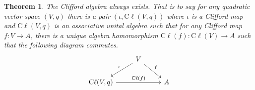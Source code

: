 \documentclass[a4paper]{report}
\newcommand{\cliff}{\mathrm{C}\ell}
\theoremstyle{definition}
\theoremstyle{plain}
\newtheorem{theorem}{Theorem}[section]
\theoremstyle{remark}
\begin{document}
\begin{theorem}
  The Clifford algebra always exists. That is to say for any quadratic vector space $(V, q)$ there is a pair $(\iota, \cliff(V,q))$ where $\iota$ is a Clifford map and $\cliff(V,q)$ is an associative unital algebra such that for any Clifford map $f\colon V \to A$, there is a unique algebra homomorphism $\cliff(f)\colon \cliff(V) \to A$ such that the following diagram commutes.
  \begin{equation*}
    \begin{tikzcd}
      & V \arrow[dr, "f"] \arrow[dl, swap, "\iota"] & \\
      \cliff(V,q) \arrow[rr, "\cliff(f)"] & & A
    \end{tikzcd}
  \end{equation*}
\end{theorem}
\end{document}
